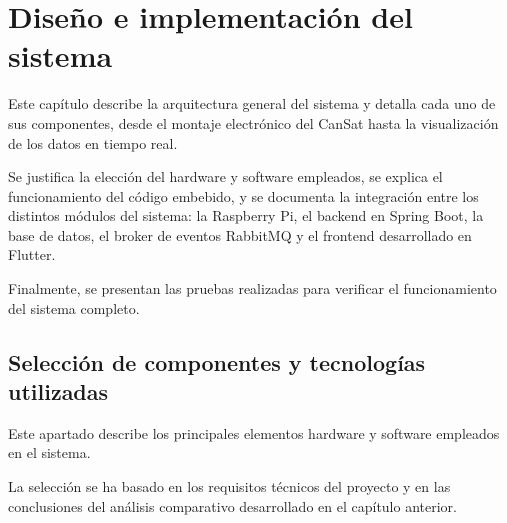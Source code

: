 \chapter{Diseño e implementación del sistema}
Este capítulo describe la arquitectura general del sistema y detalla cada uno de sus componentes, desde el montaje electrónico del CanSat hasta la visualización de los datos en tiempo real.

Se justifica la elección del hardware y software empleados, se explica el funcionamiento del código embebido, y se documenta la integración entre los distintos módulos del sistema: la Raspberry Pi, el backend en Spring Boot, la base de datos, el broker de eventos RabbitMQ y el frontend desarrollado en Flutter.

Finalmente, se presentan las pruebas realizadas para verificar el funcionamiento del sistema completo.


\section{Selección de componentes y tecnologías utilizadas}


Este apartado describe los principales elementos hardware y software empleados en el sistema.

La selección se ha basado en los requisitos técnicos del proyecto y en las conclusiones del análisis comparativo desarrollado en el capítulo anterior.

